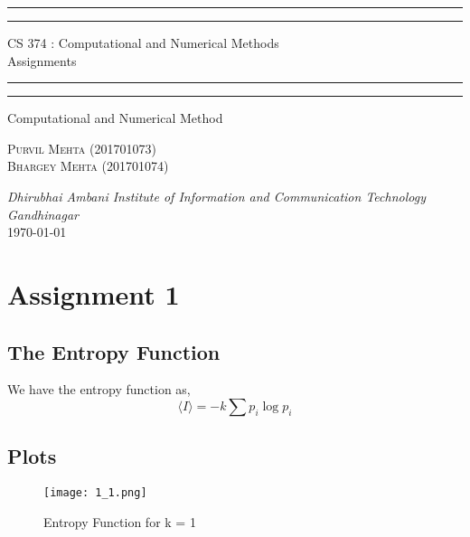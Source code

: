 \documentclass{article}
\begin{document}
\begin{titlepage}
	\centering 
	\scshape
	\vspace*{\baselineskip}
	\rule{\textwidth}{1.6pt}\vspace*{-\baselineskip}\vspace*{2pt}
	\rule{\textwidth}{0.4pt} 
	\vspace{0.75\baselineskip}
	
	{\Large CS 374 : Computational and Numerical Methods \\\vspace{0.75\baselineskip} Assignments}
	\vspace{0.75\baselineskip}
	
	\rule{\textwidth}{0.4pt}\vspace*{-\baselineskip}\vspace{3.2pt} 
	\rule{\textwidth}{1.6pt}
	
	\vspace{2\baselineskip}  
	Computational and Numerical Method
	
	\vspace*{3\baselineskip}
	
	\vspace{0.5\baselineskip} %
	
	{\scshape\large Purvil Mehta (201701073) \\ Bhargey Mehta (201701074) \\} 
	
	\vspace{1\baselineskip} 
	
	\textit{Dhirubhai Ambani Institute of Information and Communication Technology \\ Gandhinagar\\} 
	\vspace*{2\baselineskip}
	\today


\end{titlepage}

\newpage
\tableofcontents
\newpage
\section{Assignment 1}
\subsection{The Entropy Function}
We have the entropy function as,
\large{$$\langle I \rangle = -k \sum p_i\log{p_i}$$}

\subsection{Plots}
\begin{figure}[!h]
    \centering
    \texttt{[image: 1\_1.png]}
    \caption{Entropy Function for k = 1}
\end{figure}
\end{document}

